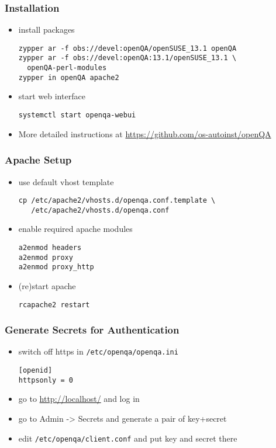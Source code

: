 %
%
\begin{frame}[fragile]
  \frametitle{Installation}
  \begin{itemize}
  \item install packages
    \lstset{style=mybash}
    \begin{lstlisting}
zypper ar -f obs://devel:openQA/openSUSE_13.1 openQA
zypper ar -f obs://devel:openQA:13.1/openSUSE_13.1 \
  openQA-perl-modules
zypper in openQA apache2
    \end{lstlisting}
    \item start web interface
    \begin{lstlisting}
systemctl start openqa-webui
    \end{lstlisting}
  \item More detailed instructions at \newline
    \url{https://github.com/os-autoinst/openQA}
  \end{itemize}
\end{frame}

\begin{frame}[fragile]
  \frametitle{Apache Setup}
  \begin{itemize}
    \item use default vhost template
    \lstset{style=mybash}
    \begin{lstlisting}
cp /etc/apache2/vhosts.d/openqa.conf.template \
   /etc/apache2/vhosts.d/openqa.conf
    \end{lstlisting}
\item enable required apache modules
    \begin{lstlisting}
a2enmod headers
a2enmod proxy
a2enmod proxy_http
    \end{lstlisting}
    \item (re)start apache
    \begin{lstlisting}
rcapache2 restart
    \end{lstlisting}
  \end{itemize}
\end{frame}

\begin{frame}[fragile]
  \frametitle{Generate Secrets for Authentication}
  \begin{itemize}
    \item switch off https in \texttt{/etc/openqa/openqa.ini}
    \begin{lstlisting}
[openid]
httpsonly = 0
    \end{lstlisting}
    \item go to \url{http://localhost/} and log in
    \item go to Admin -> Secrets and generate a pair of key+secret
    \item edit \texttt{/etc/openqa/client.conf} and put key and secret there
  \end{itemize}
\end{frame}

